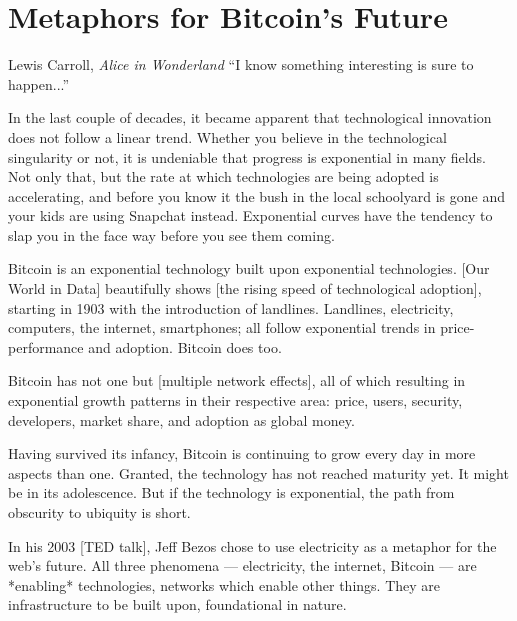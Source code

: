 \chapter{ Metaphors for Bitcoin's Future}
\label{les:21}

\begin{chapquote}{Lewis Carroll, \textit{Alice in Wonderland}}
``I know something interesting is sure to happen...''
\end{chapquote}

In the last couple of decades, it became apparent that technological
innovation does not follow a linear trend. Whether you believe in the
technological singularity or not, it is undeniable that progress is
exponential in many fields. Not only that, but the rate at which
technologies are being adopted is accelerating, and before you know it
the bush in the local schoolyard is gone and your kids are using
Snapchat instead. Exponential curves have the tendency to slap you in
the face way before you see them coming.

Bitcoin is an exponential technology built upon exponential
technologies. [Our World in Data] beautifully shows [the rising speed of
technological adoption], starting in 1903 with the introduction of
landlines. Landlines, electricity, computers, the internet, smartphones;
all follow exponential trends in price-performance and adoption. Bitcoin
does too.


Bitcoin has not one but [multiple network effects], all of which
resulting in exponential growth patterns in their respective area:
price, users, security, developers, market share, and adoption as global
money.

Having survived its infancy, Bitcoin is continuing to grow every day in
more aspects than one. Granted, the technology has not reached maturity
yet. It might be in its adolescence. But if the technology is
exponential, the path from obscurity to ubiquity is short.


In his 2003 [TED talk], Jeff Bezos chose to use electricity as a
metaphor for the web's future. All three phenomena --- electricity, the
internet, Bitcoin --- are *enabling* technologies, networks which enable
other things. They are infrastructure to be built upon, foundational in
nature.

